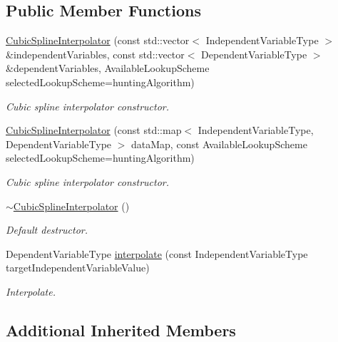 \subsection*{Public Member Functions}
\begin{DoxyCompactItemize}
\item 
\hyperlink{classtudat_1_1interpolators_1_1CubicSplineInterpolator_a003322336ae7c4f8ffb9afeda10fa7df}{Cubic\+Spline\+Interpolator} (const std\+::vector$<$ Independent\+Variable\+Type $>$ \&independent\+Variables, const std\+::vector$<$ Dependent\+Variable\+Type $>$ \&dependent\+Variables, Available\+Lookup\+Scheme selected\+Lookup\+Scheme=hunting\+Algorithm)
\begin{DoxyCompactList}\small\item\em Cubic spline interpolator constructor. \end{DoxyCompactList}\item 
\hyperlink{classtudat_1_1interpolators_1_1CubicSplineInterpolator_a91f030d51e69eb2115da2ed4e8fcbb15}{Cubic\+Spline\+Interpolator} (const std\+::map$<$ Independent\+Variable\+Type, Dependent\+Variable\+Type $>$ data\+Map, const Available\+Lookup\+Scheme selected\+Lookup\+Scheme=hunting\+Algorithm)
\begin{DoxyCompactList}\small\item\em Cubic spline interpolator constructor. \end{DoxyCompactList}\item 
\hyperlink{classtudat_1_1interpolators_1_1CubicSplineInterpolator_afc6890b74cb63542a2a450d14d089c73}{$\sim$\+Cubic\+Spline\+Interpolator} ()
\begin{DoxyCompactList}\small\item\em Default destructor. \end{DoxyCompactList}\item 
Dependent\+Variable\+Type \hyperlink{classtudat_1_1interpolators_1_1CubicSplineInterpolator_a81ec99d79a07248afe3523dcf668e00b}{interpolate} (const Independent\+Variable\+Type target\+Independent\+Variable\+Value)
\begin{DoxyCompactList}\small\item\em Interpolate. \end{DoxyCompactList}\end{DoxyCompactItemize}
\subsection*{Additional Inherited Members}


